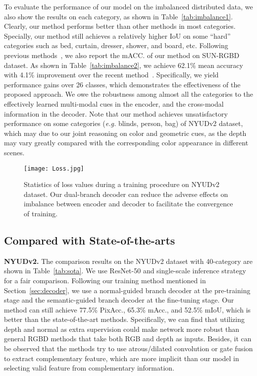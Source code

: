 \documentclass[10pt,twocolumn,letterpaper]{article}
\begin{document}
To evaluate the performance of our model on the imbalanced distributed data, we also show the results on each category, as shown in Table~\ref{tab:imbalance1}. Clearly, our method performs better than other methods in most categories. Specially, our method still achieves a relatively higher IoU on some “hard” categories such as bed, curtain, dresser, shower, and board, etc. Following previous methods~\cite{Song:CVPR15,Liu:TPAMI11,Ren:CVPR12,Cheng:CVPR17}, we also report the mACC. of our method on SUN-RGBD dataset. As shown in Table~\ref{tab:imbalance2}, we achieve 62.1\% mean accuracy with 4.1\% improvement over the recent method~\cite{Cheng:CVPR17}. Specifically, we yield performance gains over 26 classes, which demonstrates the effectiveness of the proposed approach.
We owe the robustness among almost all the categories to the effectively learned multi-modal cues in the encoder, and the cross-modal information in the decoder. Note that our method achieves unsatisfactory performance on some categories (\textit{e.g.} blinds, person, bag) of NYUDv2 dataset, which may due to our joint reasoning on color and geometric cues, as the depth may vary greatly compared with the corresponding color appearance in different scenes.

\begin{figure}[!t]
	\begin{center}
		\texttt{[image: Loss.jpg]}
	\end{center}
	\caption{Statistics of loss values during a training procedure on NYUDv2 dataset. Our dual-branch decoder can reduce the adverse effects on imbalance between encoder and decoder to facilitate the convergence of training.}
	\label{fig:loss}
\end{figure}

\subsection{Compared with State-of-the-arts}\label{sec:sota}
\noindent
\textbf{NYUDv2.}
The comparison results on the NYUDv2 dataset with 40-category are shown in Table~\ref{tab:sota}. We use ResNet-50 and single-scale inference strategy for a fair comparison. Following our training method mentioned in Section~\ref{sec:decoder}, we use a normal-guided branch decoder at the pre-training stage and the semantic-guided branch decoder at the fine-tuning stage. Our method can still achieve 77.5\% PixAcc., 65.3\% mAcc., and 52.5\% mIoU, which is better than the state-of-the-art methods. Specifically, we can find that utilizing depth and normal as extra supervision could make network more robust than general RGBD methods that take both RGB and depth as inputs. Besides, it can be observed that the methods try to use atrous/dilated convolution or gate fusion to extract complementary feature, which are more implicit than our model in selecting valid feature from complementary information.
\end{document}
